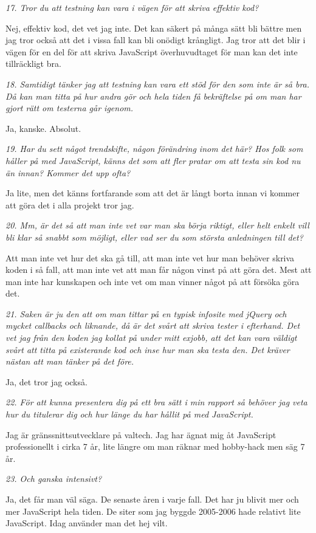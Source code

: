 \documentclass[11pt]{article}
\begin{document}
\emph{17. Tror du att testning kan vara i vägen för att skriva effektiv kod?}

Nej, effektiv kod, det vet jag inte. Det kan säkert på många sätt bli bättre men jag tror också att det i vissa fall kan bli onödigt krångligt. Jag tror att det blir i vägen för en del för att skriva JavaScript överhuvudtaget för man kan det inte tillräckligt bra.

\emph{18. Samtidigt tänker jag att testning kan vara ett stöd för den som inte är så bra. Då kan man titta på hur andra gör och hela tiden få bekräftelse på om man har gjort rätt om testerna går igenom.}

Ja, kanske. Absolut.

\emph{19. Har du sett något trendskifte, någon förändring inom det här? Hos folk som håller på med JavaScript, känns det som att fler pratar om att testa sin kod nu än innan? Kommer det upp ofta?}

Ja lite, men det känns fortfarande som att det är långt borta innan vi kommer att göra det i alla projekt tror jag.

\emph{20. Mm, är det så att man inte vet var man ska börja riktigt, eller helt enkelt vill bli klar så snabbt som möjligt, eller vad ser du som största anledningen till det?}

Att man inte vet hur det ska gå till, att man inte vet hur man behöver skriva koden i så fall, att man inte vet att man får någon vinst på att göra det. Mest att man inte har kunskapen och inte vet om man vinner något på att försöka göra det.

\emph{21. Saken är ju den att om man tittar på en typisk infosite med jQuery och mycket callbacks och liknande, då är det svårt att skriva tester i efterhand. Det vet jag från den koden jag kollat på under mitt exjobb, att det kan vara väldigt svårt att titta på existerande kod och inse hur man ska testa den. Det kräver nästan att man tänker på det före.}

Ja, det tror jag också.

\emph{22. För att kunna presentera dig på ett bra sätt i min rapport så behöver jag veta hur du titulerar dig och hur länge du har hållit på med JavaScript.}

Jag är gränssnittsutvecklare på valtech. Jag har ägnat mig åt JavaScript professionellt i cirka 7 år, lite längre om man räknar med hobby-hack men säg 7 år.

\emph{23. Och ganska intensivt?}

Ja, det får man väl säga. De senaste åren i varje fall. Det har ju blivit mer och mer JavaScript hela tiden. De siter som jag byggde 2005-2006 hade relativt lite JavaScript. Idag använder man det hej vilt.
\end{document}
